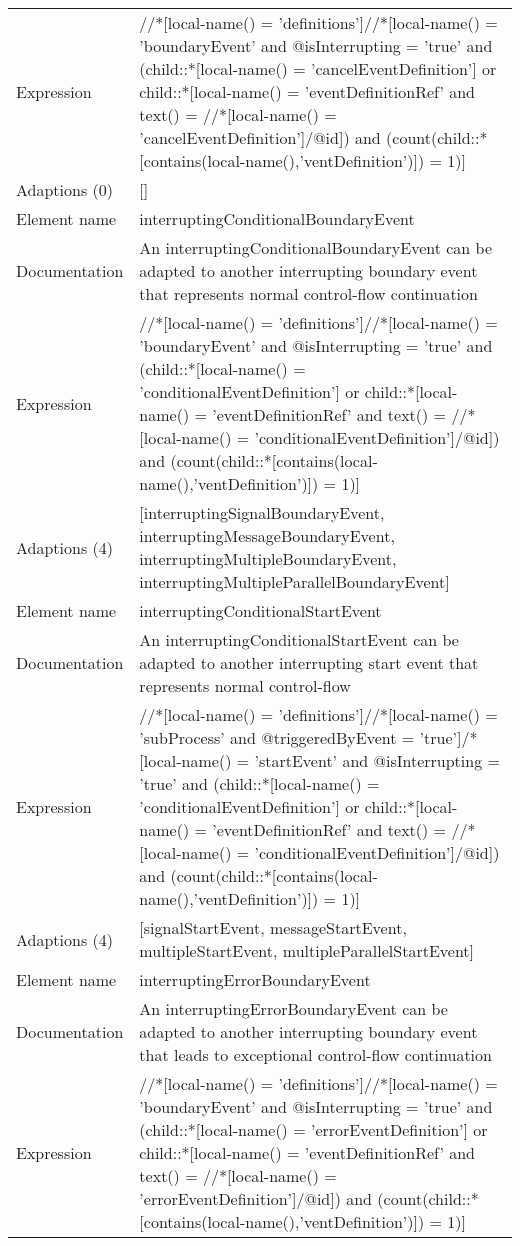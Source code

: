 \begin{center}
\begin{tiny}
\begin{longtable}{p{}|p{}}
Expression & //*[local-name() = 'definitions']//*[local-name() = 'boundaryEvent' and @isInterrupting = 'true' and (child::*[local-name() = 'cancelEventDefinition'] or child::*[local-name() = 'eventDefinitionRef' and text() = //*[local-name() = 'cancelEventDefinition']/@id]) and (count(child::*[contains(local-name(),'ventDefinition')]) = 1)]\\
\myrowcolour
Adaptions (0) & []\\
\midrule
Element name & interruptingConditionalBoundaryEvent\\
\myrowcolour
Documentation &An interruptingConditionalBoundaryEvent can be adapted to another interrupting boundary event that represents normal control-flow continuation\\
Expression & //*[local-name() = 'definitions']//*[local-name() = 'boundaryEvent' and @isInterrupting = 'true' and (child::*[local-name() = 'conditionalEventDefinition'] or child::*[local-name() = 'eventDefinitionRef' and text() = //*[local-name() = 'conditionalEventDefinition']/@id]) and (count(child::*[contains(local-name(),'ventDefinition')]) = 1)]\\
\myrowcolour
Adaptions (4) & [interruptingSignalBoundaryEvent, interruptingMessageBoundaryEvent, interruptingMultipleBoundaryEvent, interruptingMultipleParallelBoundaryEvent]\\
\midrule
Element name & interruptingConditionalStartEvent\\
\myrowcolour
Documentation &An interruptingConditionalStartEvent can be adapted to another interrupting start event that represents normal control-flow\\
Expression & //*[local-name() = 'definitions']//*[local-name() = 'subProcess' and @triggeredByEvent = 'true']/*[local-name() = 'startEvent' and @isInterrupting = 'true' and (child::*[local-name() = 'conditionalEventDefinition'] or child::*[local-name() = 'eventDefinitionRef' and text() = //*[local-name() = 'conditionalEventDefinition']/@id]) and (count(child::*[contains(local-name(),'ventDefinition')]) = 1)]\\
\myrowcolour
Adaptions (4) & [signalStartEvent, messageStartEvent, multipleStartEvent, multipleParallelStartEvent]\\
\midrule
Element name & interruptingErrorBoundaryEvent\\
\myrowcolour
Documentation &An interruptingErrorBoundaryEvent can be adapted to another interrupting boundary event that leads to exceptional control-flow continuation\\
Expression & //*[local-name() = 'definitions']//*[local-name() = 'boundaryEvent' and @isInterrupting = 'true' and (child::*[local-name() = 'errorEventDefinition'] or child::*[local-name() = 'eventDefinitionRef' and text() = //*[local-name() = 'errorEventDefinition']/@id]) and (count(child::*[contains(local-name(),'ventDefinition')]) = 1)]\\

\end{longtable}
\end{tiny}
\end{center}
